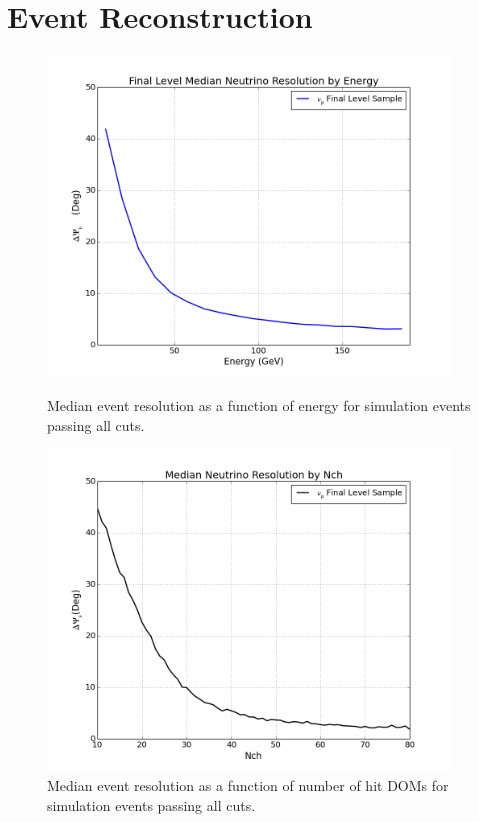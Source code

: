 \documentclass{gatech-thesis}
\begin{document}
\section{Event Reconstruction}
\begin{figure}[ht]
\centering
\begin{minipage}[b]{0.45\linewidth}
\includegraphics[width=0.95\textwidth]{FinalLevel_NeutrinoResolutionByEnergy_JustGENIE.png}
\caption{Median event resolution as a function of energy for simulation events passing all cuts.}
\label{fig:EventSampleRes_Energy}
\end{minipage}
\quad
\begin{minipage}[b]{0.45\linewidth}

\includegraphics[width=0.95\textwidth]{GENIE_FinalLevel_NeutrinoResolutionByNch.png}

\caption{Median event resolution as a function of number of hit DOMs for simulation events passing all cuts.}
\label{fig:EventSampleRes_Nch}
\end{minipage}
\end{figure}
\end{document}
